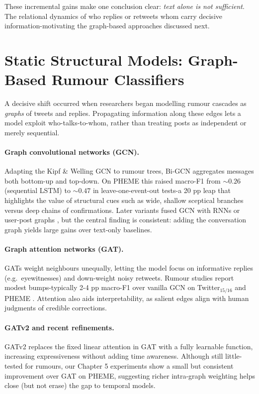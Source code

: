 \documentclass{cshonours}
\begin{document}
These incremental gains make one conclusion clear: \emph{text alone is not sufficient}.  The relational dynamics of who replies or retweets whom carry decisive information-motivating the graph-based approaches discussed next.


\section{Static Structural Models: Graph-Based Rumour Classifiers}
A decisive shift occurred when researchers began modelling rumour cascades as \emph{graphs} of tweets and replies.  Propagating information along these edges lets a model exploit who-talks-to-whom, rather than treating posts as independent or merely sequential.

\paragraph{Graph convolutional networks (GCN).}
Adapting the Kipf \& Welling GCN \cite{kipf2017semi} to rumour trees, Bi-GCN \cite{bian2020rumor} aggregates messages both bottom-up and top-down.  On PHEME this raised macro-F1 from \(\sim\!0.26\) (sequential LSTM) to \(\sim\!0.47\) in leave-one-event-out tests-a 20 pp leap that highlights the value of structural cues such as wide, shallow sceptical branches versus deep chains of confirmations.  Later variants fused GCN with RNNs or user-post graphs \cite{wang2020satire}, but the central finding is consistent: adding the conversation graph yields large gains over text-only baselines.

\paragraph{Graph attention networks (GAT).}
GATs \cite{velickovic2018gat} weight neighbours unequally, letting the model focus on informative replies (e.g.\ eyewitnesses) and down-weight noisy retweets.  Rumour studies report modest bumps-typically 2-4 pp macro-F1 over vanilla GCN on Twitter$_{15/16}$ and PHEME \cite{lv2022rumor, patel2022rumour}.  Attention also aids interpretability, as salient edges align with human judgments of credible corrections.

\paragraph{GATv2 and recent refinements.}
GATv2 \cite{brody2022gatv2} replaces the fixed linear attention in GAT with a fully learnable function, increasing expressiveness without adding time awareness.  Although still little-tested for rumours, our Chapter 5 experiments show a small but consistent improvement over GAT on PHEME, suggesting richer intra-graph weighting helps close (but not erase) the gap to temporal models.
\end{document}
